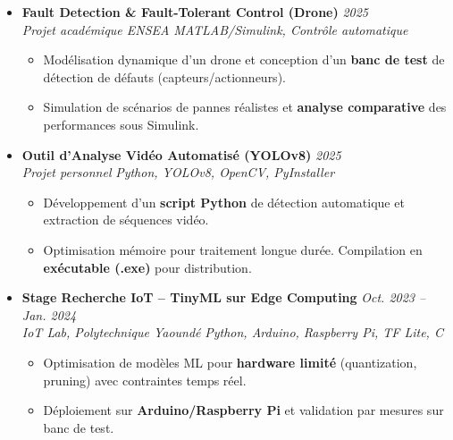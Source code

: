 \documentclass[a4paper,11pt]{article}
\begin{document}
\begin{itemize}[leftmargin=*, label={-}]
\item \textbf{Fault Detection \& Fault-Tolerant Control (Drone)} \hfill \textit{2025} \\
\textit{Projet académique ENSEA} \hfill \textit{MATLAB/Simulink, Contrôle automatique}
\vspace{-2pt}
    \begin{itemize}[leftmargin=0.4cm, nosep, label=\tiny$\bullet$]
        \item \small{Modélisation dynamique d'un drone et conception d'un \textbf{banc de test} de détection de défauts (capteurs/actionneurs).}
        \item \small{Simulation de scénarios de pannes réalistes et \textbf{analyse comparative} des performances sous Simulink.}
    \end{itemize}
\vspace{3pt}

\item \textbf{Outil d'Analyse Vidéo Automatisé (YOLOv8)} \hfill \textit{2025} \\
\textit{Projet personnel} \hfill \textit{Python, YOLOv8, OpenCV, PyInstaller}
\vspace{-2pt}
    \begin{itemize}[leftmargin=0.4cm, nosep, label=\tiny$\bullet$]
        \item \small{Développement d'un \textbf{script Python} de détection automatique et extraction de séquences vidéo.}
        \item \small{Optimisation mémoire pour traitement longue durée. Compilation en \textbf{exécutable (.exe)} pour distribution.}
    \end{itemize}
\vspace{3pt}

\item \textbf{Stage Recherche IoT -- TinyML sur Edge Computing} \hfill \textit{Oct. 2023 -- Jan. 2024} \\
\textit{IoT Lab, Polytechnique Yaoundé} \hfill \textit{Python, Arduino, Raspberry Pi, TF Lite, C}
\vspace{-2pt}
    \begin{itemize}[leftmargin=0.4cm, nosep, label=\tiny$\bullet$]
        \item \small{Optimisation de modèles ML pour \textbf{hardware limité} (quantization, pruning) avec contraintes temps réel.}
        \item \small{Déploiement sur \textbf{Arduino/Raspberry Pi} et validation par mesures sur banc de test.}
    \end{itemize}
\vspace{3pt}

\end{itemize}
\end{document}
